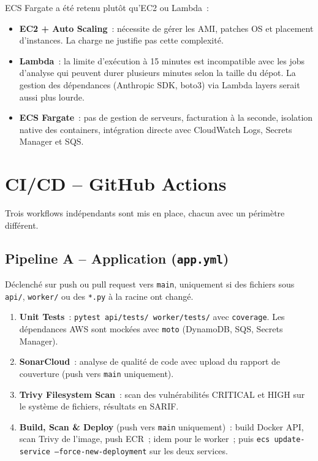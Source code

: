 \documentclass[11pt,a4paper]{article}
\newcommand{\code}[1]{\texttt{#1}}
\begin{document}
ECS Fargate a \'{e}t\'{e} retenu plut\^{o}t qu'EC2 ou Lambda~:

\begin{itemize}[noitemsep]
  \item \textbf{EC2 + Auto Scaling}~: n\'{e}cessite de g\'{e}rer les AMI, patches OS et placement d'instances. La charge ne justifie pas cette complexit\'{e}.
  \item \textbf{Lambda}~: la limite d'ex\'{e}cution \`{a} 15 minutes est incompatible avec les jobs d'analyse qui peuvent durer plusieurs minutes selon la taille du d\'{e}pot. La gestion des d\'{e}pendances (Anthropic SDK, boto3) via Lambda layers serait aussi plus lourde.
  \item \textbf{ECS Fargate}~: pas de gestion de serveurs, facturation \`{a} la seconde, isolation native des containers, int\'{e}gration directe avec CloudWatch Logs, Secrets Manager et SQS.
\end{itemize}

\section{CI/CD -- GitHub Actions}

Trois workflows ind\'{e}pendants sont mis en place, chacun avec un p\'{e}rim\`{e}tre diff\'{e}rent.

\subsection{Pipeline A -- Application (\code{app.yml})}

D\'{e}clench\'{e} sur push ou pull request vers \code{main}, uniquement si des fichiers sous \code{api/}, \code{worker/} ou des \code{*.py} \`{a} la racine ont chang\'{e}.

\begin{enumerate}[noitemsep]
  \item \textbf{Unit Tests}~: \code{pytest api/tests/ worker/tests/} avec \code{coverage}. Les d\'{e}pendances AWS sont mock\'{e}es avec \code{moto} (DynamoDB, SQS, Secrets Manager).
  \item \textbf{SonarCloud}~: analyse de qualit\'{e} de code avec upload du rapport de couverture (push vers \code{main} uniquement).
  \item \textbf{Trivy Filesystem Scan}~: scan des vuln\'{e}rabilit\'{e}s CRITICAL et HIGH sur le syst\`{e}me de fichiers, r\'{e}sultats en SARIF.
  \item \textbf{Build, Scan \& Deploy} (push vers \code{main} uniquement)~: build Docker API, scan Trivy de l'image, push ECR~; idem pour le worker~; puis \code{ecs update-service --force-new-deployment} sur les deux services.
\end{enumerate}
\end{document}
